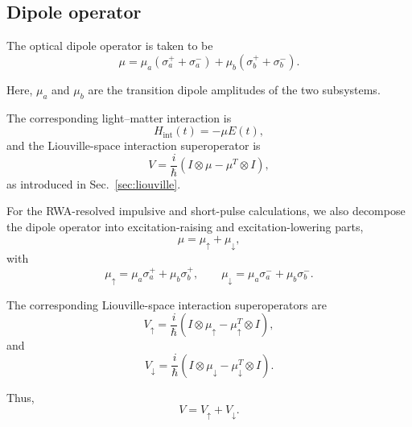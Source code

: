 \documentclass[11pt]{article}
\begin{document}
\subsection{Dipole operator}

The optical dipole operator is taken to be
%
\begin{equation}
\boxed{
\mu
=
\mu_a
\left(
\sigma_a^+
+
\sigma_a^-
\right)
+
\mu_b
\left(
\sigma_b^+
+
\sigma_b^-
\right).
}
\label{eq:dimer_dipole}
\end{equation}

Here, $\mu_a$ and $\mu_b$ are the transition dipole amplitudes of the
two subsystems.

The corresponding light--matter interaction is
%
\begin{equation}
H_{\mathrm{int}}(t)
=
-\mu E(t),
\end{equation}
%
and the Liouville-space interaction superoperator is
%
\begin{equation}
V
=
\frac{i}{\hbar}
\left(
I\otimes\mu
-
\mu^T\otimes I
\right),
\end{equation}
%
as introduced in Sec.~\ref{sec:liouville}.

For the RWA-resolved impulsive and short-pulse calculations, we also
decompose the dipole operator into excitation-raising and
excitation-lowering parts,
%
\begin{equation}
\boxed{
\mu
=
\mu_{\uparrow}
+
\mu_{\downarrow},
}
\end{equation}
%
with
%
\begin{equation}
\mu_{\uparrow}
=
\mu_a\sigma_a^+
+
\mu_b\sigma_b^+,
\qquad
\mu_{\downarrow}
=
\mu_a\sigma_a^-
+
\mu_b\sigma_b^-.
\end{equation}

The corresponding Liouville-space interaction superoperators are
%
\begin{equation}
\boxed{
V_{\uparrow}
=
\frac{i}{\hbar}
\left(
I\otimes\mu_{\uparrow}
-
\mu_{\uparrow}^T\otimes I
\right),
}
\end{equation}
%
and
%
\begin{equation}
\boxed{
V_{\downarrow}
=
\frac{i}{\hbar}
\left(
I\otimes\mu_{\downarrow}
-
\mu_{\downarrow}^T\otimes I
\right).
}
\end{equation}

Thus,
%
\begin{equation}
\boxed{
V
=
V_{\uparrow}
+
V_{\downarrow}.
}
\end{equation}
\end{document}
